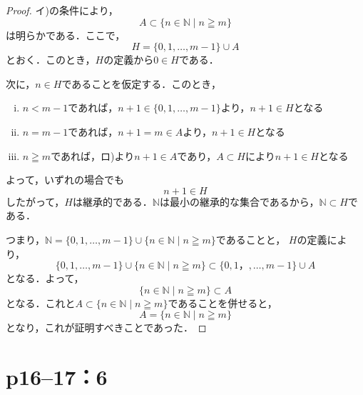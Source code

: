 \begin{tleftbar}
    \begin{proof}
        イ)の条件により，
        \[
            A \subset \{n \in \mathbb{N} \mid n \geqq m\}
        \]
        は明らかである．ここで，
        \[
            H=\{0,1,\dots,m-1\} \cup A
        \]
        とおく．このとき，$H$の定義から$0 \in H$である．

        次に，$n \in H$であることを仮定する．このとき，
        \begin{enumerate}[(i)]
            \item  $n<m-1$であれば，$n+1 \in \{0,1,\dots,m-1\}$より，$n+1 \in H$となる
            \item $n=m-1$であれば，$n+1=m \in A$より，$n+1 \in H$となる
            \item $n \geqq m$であれば，ロ)より$n+1 \in A$であり，$A \subset H $により$n + 1\in H$となる
        \end{enumerate}
        よって，いずれの場合でも
        \[
            n+1 \in H
        \]
        したがって，$H$は継承的である．$\mathbb{N}$は最小の継承的な集合であるから，$\mathbb{N} \subset H$である．

        つまり，$\mathbb{N} =  \{0,1,\dots,m-1\} \cup \{n \in \mathbb{N} \mid n \geqq m \}$であることと，
        $H$の定義により，
        \[
            \{0,1,\dots,m-1\} \cup \{n \in \mathbb{N} \mid n \geqq m \} \subset \{0,1，,\dots,m-1\} \cup A
        \]
        となる．よって，
        \[
            \{n \in \mathbb{N}\mid n \geqq m \} \subset A
        \]
        となる．これと$ A \subset \{n \in \mathbb{N} \mid n \geqq m\}$であることを併せると，
        \[
            A=\{n \in \mathbb{N} \mid n \geqq m \}
        \]
        となり，これが証明すべきことであった．
    \end{proof}
\end{tleftbar}

\newpage

\section*{p16--17：6}


